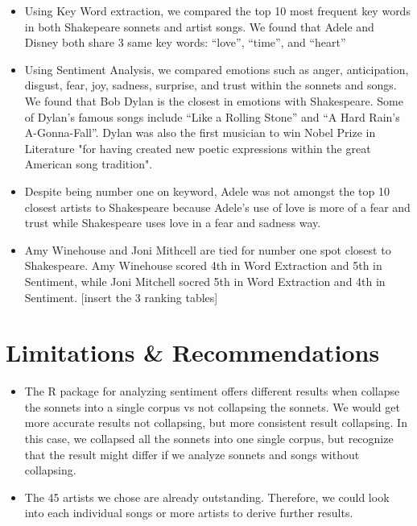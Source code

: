 \documentclass[10pt,a4paper]{article}
\begin{document}
\begin{itemize}

\item Using Key Word extraction, we compared the top 10 most frequent key words in both Shakepeare sonnets and artist songs. We found that Adele and Disney both share 3 same key words: “love”, “time”, and “heart”
\item Using Sentiment Analysis, we compared emotions such as anger, anticipation, disgust, fear, joy, sadness, surprise, and trust within the sonnets and songs. We found that Bob Dylan is the closest in emotions with Shakespeare. Some of Dylan’s famous songs include “Like a Rolling Stone” and “A Hard Rain’s A-Gonna-Fall”. Dylan was also the first musician to win Nobel Prize in Literature "for having created new poetic expressions within the great American song tradition".
\item Despite being number one on keyword, Adele was not amongst the top 10 closest artists to Shakespeare because Adele’s use of love is more of a fear and trust while Shakespeare uses love in a fear and sadness way.
\item Amy Winehouse and Joni Mithcell are tied for number one spot closest to Shakespeare. Amy Winehouse scored 4th in Word Extraction and 5th in Sentiment, while Joni Mitchell socred 5th in Word Extraction and 4th in Sentiment.  [insert the 3 ranking tables]

\end{itemize}


\section{Limitations \& Recommendations}
\begin{itemize}

\item The R package for analyzing sentiment offers different results when collapse the sonnets into a single corpus vs not collapsing the sonnets. We would get more accurate results not collapsing, but more consistent result collapsing. In this case, we collapsed all the sonnets into one single corpus, but recognize that the result might differ if we analyze sonnets and songs without collapsing.
\item The 45 artists we chose are already outstanding. Therefore, we could look into each individual songs or more artists to derive further results.

\end{itemize}
\end{document}
